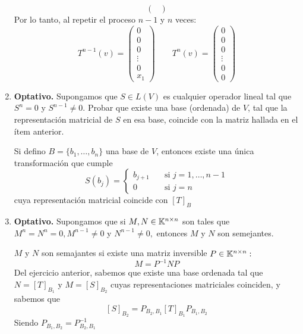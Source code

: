\begin{enumerate}
\begin{mdframed}[style=s]
\[\begin{pmatrix}
                \end{pmatrix}\]
                Por lo tanto, al repetir el proceso $n-1$ y $n$ veces:\[T^{n-1}(v)=\begin{pmatrix}
                    0\\0\\0\\\vdots\\0\\x_1
                \end{pmatrix}\qquad T^n(v)=\begin{pmatrix}
                    0\\0\\0\\\vdots\\0\\0
                \end{pmatrix}\]
            \end{mdframed}
        \item \textbf{Optativo.} Supongamos que $S\in L(V)$ es cualquier operador lineal tal que $S^n=0$ y $S^{n-1}\neq0.$ Probar que existe una base (ordenada) de $V$, tal que la representación matricial de $S$ en esa base, coincide con la matriz hallada en el ítem anterior.
            \begin{mdframed}[style=s]
                Si defino $B=\{b_1,\dots,b_n\}$ una base de $V$, entonces existe una única transformación que cumple
                \[S(b_j)=\begin{cases}
                    b_{j+1}\quad&\text{si }j=1,\dots,n-1\\
                    0 &\text{si }j=n
                \end{cases}\]
                cuya representación matricial coincide con $[T]_B$
            \end{mdframed}
        \item \textbf{Optativo.} Supongamos que si $M,N\in\mathbb{K}^{n\times n}$ son tales que $M^n=N^n=0,M^{n-1}\neq0$ y $N^{n-1}\neq0,$ entonces $M$ y $N$ son semejantes.
            \begin{mdframed}[style=s]
                $M$ y $N$ son semajantes si existe una matriz inversible $P\in\mathbb{K}^{n\times n}:$\[M=P^{-1}NP\]
                Del ejercicio anterior, sabemos que existe una base ordenada tal que $N=[T]_{B_1}$ y $M=[S]_{B_2}$ cuyas representaciones matriciales coinciden, y sabemos que \[[S]_{B_2}=P_{B_2,B_1}[T]_{B_1}P_{B_1,B_2}\]
                Siendo $P_{B_1,B_2}=P_{B_2,B_1}^{-1}$
            \end{mdframed}
    \end{enumerate}